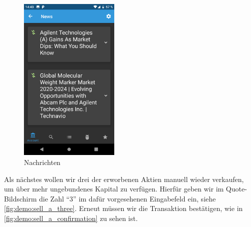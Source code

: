\documentclass[a4paper]{article}
\begin{document}
\begin{figure}[H]
	\centering
	\includegraphics[height=8cm,keepaspectratio]{./images/demo/news.png}
	\caption{Nachrichten}
	\label{fig:demo:news}
\end{figure}

Als nächstes wollen wir drei der erworbenen Aktien manuell wieder verkaufen, um über mehr ungebundenes Kapital zu verfügen. Hierfür geben wir im Quote-Bildschirm die Zahl "`3"' im dafür vorgesehenen Eingabefeld ein, siehe \autoref{fig:demo:sell_a_three}. Erneut müssen wir die Transaktion bestätigen, wie in \autoref{fig:demo:sell_a_confirmation} zu sehen ist.
\end{document}
